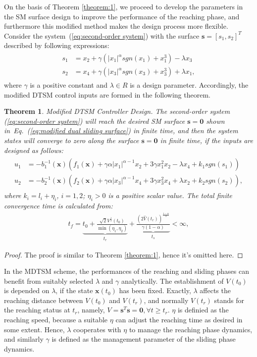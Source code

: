 \documentclass[3p]{elsarticle}
\theoremstyle{plain}
\newtheorem{mythm}{Theorem}
\theoremstyle{remark}
\begin{document}
On the basis of Theorem \ref{theorem:1}, we proceed to develop the parameters in the SM surface design to improve the performance of the reaching phase, and furthermore this modified method makes the design process more flexible. Consider the system~(\ref{eq:second-order system}) with the surface $\bm s = [s_1,s_2]^T$ described by following expressions:
\begin{align}
\begin{split}
s_1 &= x_2+\gamma(\vert x_1\vert^{\alpha} sgn(x_1)+x_1^3)-\lambda x_3\\
s_2 &= x_4+\gamma(\vert x_3\vert^{\alpha} sgn(x_3)+x_3^3)+\lambda x_1,\label{eq:modified dual sliding surface}
\end{split}
\end{align}
where $\gamma$ is a positive constant and $\lambda\in R$ is a design parameter. Accordingly, the modified DTSM control inputs are formed in the following theorem.
\begin{mythm}\label{theorem:2}Modified DTSM Controller Design.
The second-order system (\ref{eq:second-order system}) will reach the desired SM surface $\bm s = \bm 0$ shown in~Eq.~(\ref{eq:modified dual sliding surface}) in finite time, and then the system states will converge to zero along the surface $\bm s=\bm 0$ in finite time, if the inputs are designed as follows:
\begin{align}
\begin{split}
u_1 &= -b_1^{-1}(\bm x)(f_1(\bm x)+\gamma\alpha\vert x_1\vert^{\alpha-1}x_2+3\gamma x_1^2x_2-\lambda x_4+k_1sgn(s_1))\\
u_2 &= -b_2^{-1}(\bm x)(f_2(\bm x)+\gamma\alpha\vert x_3\vert^{\alpha-1}x_4+3\gamma x_3^2x_4+\lambda x_2+k_2sgn(s_2)),\label{eq:modified input}
\end{split}
\end{align}
where $k_i = l_i+\eta_i$, $i=1,2$; $\eta_i>0$ is a positive scalar value. The total finite convergence time is calculated from:
\begin{align}
t_f = \underbrace{t_0+\frac{\sqrt{2}V^{\frac{1}{2}}(t_0)}{\min(\eta_1,\eta_2)}}_{t_r}+\underbrace{\frac{(2\hat V(t_r))^{\frac{1-\alpha}{2}}}{\gamma(1-\alpha)}}_{t_s}<\infty,\label{eq:total convergence time}
\end{align}
\end{mythm}
\begin{proof}
The proof is similar to Theorem \ref{theorem:1}, hence it's omitted here.
\end{proof}
In the MDTSM scheme, the performances of the reaching and sliding phases can benefit from suitably selected $\lambda$ and $\gamma$ analytically. The establishment of $V(t_0)$ is depended on $\lambda$, if the state $\bm x(t_0)$ has been fixed. Exactly, $\lambda$ affects the reaching distance between $V(t_0)$ and $V(t_r)$, and normally $V(t_r)$ stands for the reaching status at $t_r$, namely, $V=\bm s^T\bm s = \bm 0,\forall t\ge t_r$. $\eta$ is definied as the reaching speed, because a suitable $\eta$ can adjust the reaching time as desired in some extent. Hence, $\lambda$ cooperates with $\eta$ to manage the reaching phase dynamics, and similarly $\gamma$ is defined as the management parameter of the sliding phase dynamics.
\end{document}
